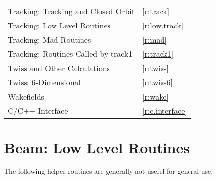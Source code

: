 \begin{center}
\begin{tabular}{ll}
  Tracking: Tracking and Closed Orbit         & \ref{r:track}          \\
  Tracking: Low Level Routines                & \ref{r:low.track}      \\
  Tracking: Mad Routines                      & \ref{r:mad}            \\
  Tracking: Routines Called by track1         & \ref{r:track1}         \\
  Twiss and Other Calculations                & \ref{r:twiss}          \\
  Twiss: 6-Dimensional                        & \ref{r:twiss6}         \\
  Wakefields                                  & \ref{r:wake}           \\
  C/C++ Interface                             & \ref{r:c.interface}    \\
\end{tabular}
\end{center}
\toffset

\section{Beam: Low Level Routines}
\label{r:low.beam}

The following helper routines are generally not useful for general use.

